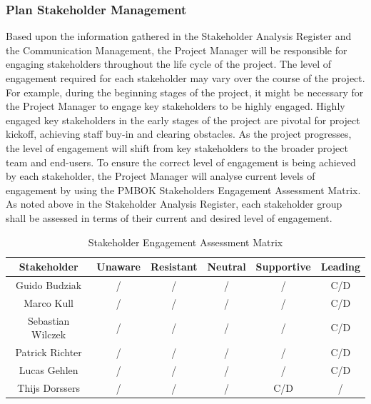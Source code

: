 \subsubsection{Plan Stakeholder Management}
\label{sssec:plan_stakeholder_management}

Based upon the information gathered in the Stakeholder Analysis Register and the Communication Management, the Project Manager will be responsible for engaging stakeholders throughout the life cycle of the project. The level of engagement required for each stakeholder may vary over the course of the project. For example, during the beginning stages of the project, it might be necessary for the Project Manager to engage key stakeholders to be highly engaged.  Highly engaged key stakeholders in the early stages of the project are pivotal for project kickoff, achieving staff buy-in and clearing obstacles.  As the project progresses, the level of engagement will shift from key stakeholders to the broader project team and end-users.  
\newline
To ensure the correct level of engagement is being achieved by each stakeholder, the Project Manager will analyse current levels of engagement by using the PMBOK Stakeholders Engagement Assessment Matrix.  As noted above in the Stakeholder Analysis Register, each stakeholder group shall be assessed in terms of their current and desired level of engagement.
 
 \begin{table}[H]
    \centering
    \begin{tabular}{|c|c|c|c|c|c|}
        \hline
        \cellcolor{gray}Stakeholder & \cellcolor{gray}Unaware & 
        \cellcolor{gray}Resistant & \cellcolor{gray}Neutral & 
        \cellcolor{gray}Supportive & \cellcolor{gray}Leading\\ \hline
        Guido Budziak & / & / & / & / & C/D \\ \hline
        Marco Kull & / & / & / & / & C/D   \\ \hline
        Sebastian Wilczek & / & / & / & / & C/D   \\ \hline
        Patrick Richter & / & / & / & / & C/D    \\ \hline
        Lucas Gehlen & / & / & / & / & C/D   \\ \hline
        Thijs Dorssers & / & / & / & C/D  & / \\ \hline
    \end{tabular}
    \caption{Stakeholder Engagement Assessment Matrix}
    \label{tab:stakeholder_engagement_assessment_matrix}
\end{table}

